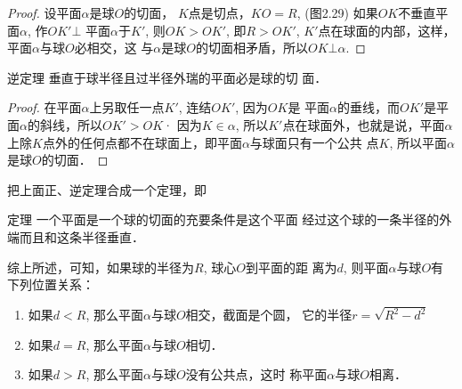 \begin{figure}[htp]
    \centering
{}   
    \caption{}
\end{figure}

\begin{proof}
    设平面$\alpha$是球$O$的切面，
    $K$点是切点，$KO=R$, (图2.29)
    如果$OK$不垂直平面$\alpha$, 作$OK'\bot$
    平面$\alpha$于$K'$, 则$OK>OK'$, 即$R>OK'$, $K'$点在球面的内部，这样，平面$\alpha$与球$O$必相交，这
与$\alpha$是球$O$的切面相矛盾，所以$OK\bot\alpha$.
\end{proof}

\begin{blk}
  {逆定理} 垂直于球半径且过半径外瑞的平面必是球的切
面．  
\end{blk}

\begin{proof}
在平面$\alpha$上另取任一点$K'$, 连结$OK'$, 因为$OK$是
平面$\alpha$的垂线，而$OK'$是平面$\alpha$的斜线，所以$OK'>OK$· 
因为$K\in\alpha$, 所以$K'$点在球面外，也就是说，平面$\alpha$上除$K$点外的任何点都不在球面上，即平面$\alpha$与球面只有一个公共
点$K$, 所以平面$\alpha$是球$O$的切面．
\end{proof}

把上面正、逆定理合成一个定理，即

\begin{blk}
    {定理} 一个平面是一个球的切面的充要条件是这个平面
经过这个球的一条半径的外端而且和这条半径垂直．
\end{blk}

综上所述，可知，如果球的半径为$R$, 球心$O$到平面的距
离为$d$, 则平面$\alpha$与球$O$有下列位置关系：
\begin{enumerate}
\item 如果$d<R$, 那么平面$\alpha$与球$O$相交，截面是个圆，
它的半径$r=\sqrt{R^2-d^2}$
\item 如果$d=R$, 那么平面$\alpha$与球$O$相切．
\item 如果$d>R$, 那么平面$\alpha$与球$O$没有公共点，这时
称平面$\alpha$与球$O$相离．
\end{enumerate}

